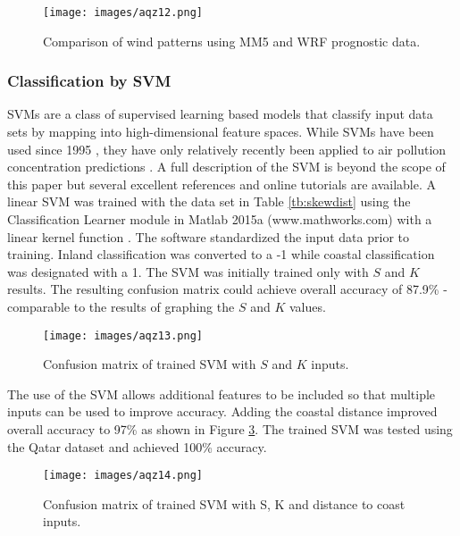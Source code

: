 %
\begin{figure}[H]
\texttt{[image: images/aqz12.png]} 
\caption[Comparison of wind patterns using prognostic data]{Comparison of wind patterns using MM5 and WRF prognostic data.}
\label{fig:12windcompare}
\end{figure}
%

\subsubsection{Classification by SVM}

SVMs are a class of supervised learning based models that classify input data sets by mapping into high-dimensional feature spaces. While SVMs have been used since 1995 \citep{Cortes1995}, they have only relatively recently been applied to air pollution concentration predictions \citep{Lu2005, Luna2014, Moazami2016}. A full description of the SVM is beyond the scope of this paper but several excellent references and online tutorials are available. A linear SVM was trained with the data set in Table \ref{tb:skewdist} using the Classification Learner module in Matlab 2015a (www.mathworks.com) with a linear kernel function \citep{Yang2011}. The software standardized the input data prior to training. Inland classification was converted to a -1 while coastal classification was designated with a 1. The SVM was initially trained only with $S$ and $K$ results. The resulting confusion matrix could achieve overall accuracy of 87.9\% - comparable to the results of graphing the $S$ and $K$ values.  

%
\begin{figure}[H]
\texttt{[image: images/aqz13.png]} 
\caption{Confusion matrix of trained SVM with $S$ and $K$ inputs.}
\label{fig:13confusionSK}
\end{figure}
%

The use of the SVM allows additional features to be included so that multiple inputs can be used to improve accuracy. Adding the coastal distance improved overall accuracy to 97\% as shown in Figure \ref{fig:14confusionSKdist}. The trained SVM was tested using the Qatar dataset and achieved 100\% accuracy. 

%
\begin{figure}[H]
\texttt{[image: images/aqz14.png]} 
\caption{Confusion matrix of trained SVM with S, K and distance to coast inputs.}
\label{fig:14confusionSKdist}
\end{figure}
%
 
